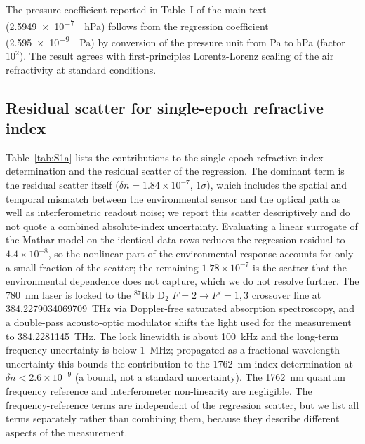 \documentclass[aps,prapplied,reprint,superscriptaddress]{revtex4-2}
\begin{document}
The pressure coefficient reported in Table~I of the main text (\SI{+2.5949e-7}{\per\hecto\pascal}) follows from the regression coefficient (\SI{+2.595e-9}{\per\pascal}) by conversion of the pressure unit from Pa to hPa (factor $10^2$). The result agrees with first-principles Lorentz-Lorenz scaling of the air refractivity at standard conditions.

\subsection{Residual scatter for single-epoch refractive index}
\label{sec:S1a}

Table~\ref{tab:S1a} lists the contributions to the single-epoch refractive-index determination and the residual scatter of the regression. The dominant term is the residual scatter itself ($\delta n = 1.84 \times 10^{-7}$, $1\sigma$), which includes the spatial and temporal mismatch between the environmental sensor and the optical path as well as interferometric readout noise; we report this scatter descriptively and do not quote a combined absolute-index uncertainty. Evaluating a linear surrogate of the Mathar model on the identical data rows reduces the regression residual to $4.4 \times 10^{-8}$, so the nonlinear part of the environmental response accounts for only a small fraction of the scatter; the remaining $1.78 \times 10^{-7}$ is the scatter that the environmental dependence does not capture, which we do not resolve further. The \SI{780}{\nano\meter} laser is locked to the $^{87}$Rb D$_2$ $F = 2 \rightarrow F' = 1,3$ crossover line at \SI{384.2279034069709}{\tera\hertz} via Doppler-free saturated absorption spectroscopy, and a double-pass acousto-optic modulator shifts the light used for the measurement to \SI{384.2281145}{\tera\hertz}. The lock linewidth is about \SI{100}{\kilo\hertz} and the long-term frequency uncertainty is below \SI{1}{\mega\hertz}; propagated as a fractional wavelength uncertainty this bounds the contribution to the \SI{1762}{\nano\meter} index determination at $\delta n < 2.6 \times 10^{-9}$ (a bound, not a standard uncertainty). The \SI{1762}{\nano\meter} quantum frequency reference and interferometer non-linearity are negligible. The frequency-reference terms are independent of the regression scatter, but we list all terms separately rather than combining them, because they describe different aspects of the measurement.
\end{document}
